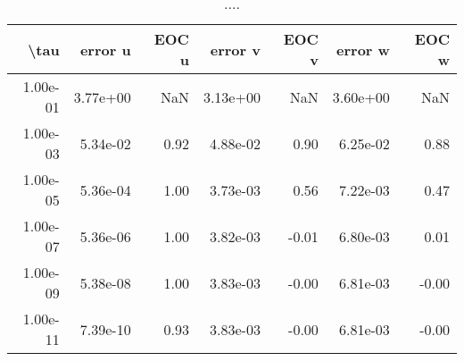 \begin{table}[ht]
\centering
\begin{tabular}{rrrrrrr}
  \hline
  \textbf{\textbackslash{}tau} & \textbf{error u} & \textbf{EOC u} & \textbf{error v} & \textbf{EOC v} & \textbf{error w} & \textbf{EOC w} \\\hline
  1.00e-01 & 3.77e+00 & NaN & 3.13e+00 & NaN & 3.60e+00 & NaN \\
  1.00e-03 & 5.34e-02 & 0.92 & 4.88e-02 & 0.90 & 6.25e-02 & 0.88 \\
  1.00e-05 & 5.36e-04 & 1.00 & 3.73e-03 & 0.56 & 7.22e-03 & 0.47 \\
  1.00e-07 & 5.36e-06 & 1.00 & 3.82e-03 & -0.01 & 6.80e-03 & 0.01 \\
  1.00e-09 & 5.38e-08 & 1.00 & 3.83e-03 & -0.00 & 6.81e-03 & -0.00 \\
  1.00e-11 & 7.39e-10 & 0.93 & 3.83e-03 & -0.00 & 6.81e-03 & -0.00 \\\hline
\end{tabular}
\caption{....}
\end{table}

